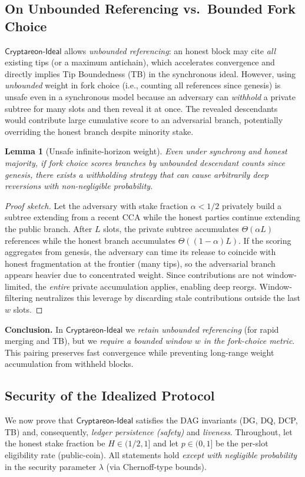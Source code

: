 \documentclass[11pt]{article}
\newtheorem{lemma}[theorem]{Lemma}
\newcommand{\ProjIdeal}{\ensuremath{\mathsf{Cryptareon\text{-}Ideal}}\xspace}
\begin{document}
\subsection{On Unbounded Referencing vs.\ Bounded Fork Choice}
\label{subsec:ideal-window-justification}
\ProjIdeal allows \emph{unbounded referencing}: an honest block may cite \emph{all} existing tips (or a maximum antichain), which accelerates convergence and directly implies Tip Boundedness (TB) in the synchronous ideal.
However, using \emph{unbounded} weight in fork choice (i.e., counting all references since genesis) is unsafe even in a synchronous model because an adversary can \emph{withhold} a private subtree for many slots and then reveal it at once. The revealed descendants would contribute large cumulative score to an adversarial branch, potentially overriding the honest branch despite minority stake.

\begin{lemma}[Unsafe infinite-horizon weight]
Even under synchrony and honest majority, if fork choice scores branches by \emph{unbounded} descendant counts since genesis, there exists a withholding strategy that can cause arbitrarily deep reversions with non-negligible probability.
\end{lemma}

\begin{proof}[Proof sketch]
Let the adversary with stake fraction $\alpha<1/2$ privately build a subtree extending from a recent CCA while the honest parties continue extending the public branch. After $L$ slots, the private subtree accumulates $\Theta(\alpha L)$ references while the honest branch accumulates $\Theta((1-\alpha)L)$. If the scoring aggregates from genesis, the adversary can time its release to coincide with honest fragmentation at the frontier (many tips), so the adversarial branch appears heavier due to concentrated weight. Since contributions are not window-limited, the \emph{entire} private accumulation applies, enabling deep reorgs. Window-filtering neutralizes this leverage by discarding stale contributions outside the last $w$ slots.
\end{proof}

\noindent\textbf{Conclusion.} In \ProjIdeal we \emph{retain unbounded referencing} (for rapid merging and TB), but we \emph{require a bounded window $w$ in the fork-choice metric}. This pairing preserves fast convergence while preventing long-range weight accumulation from withheld blocks.

\subsection{Security of the Idealized Protocol}
\label{subsec:ideal-security}
We now prove that \ProjIdeal satisfies the DAG invariants (DG, DQ, DCP, TB) and, consequently, \emph{ledger persistence (safety)} and \emph{liveness}. Throughout, let the honest stake fraction be $H\in(1/2,1]$ and let $p\in(0,1]$ be the per-slot eligibility rate (public-coin). All statements hold \emph{except with negligible probability} in the security parameter $\lambda$ (via Chernoff-type bounds).
\end{document}
